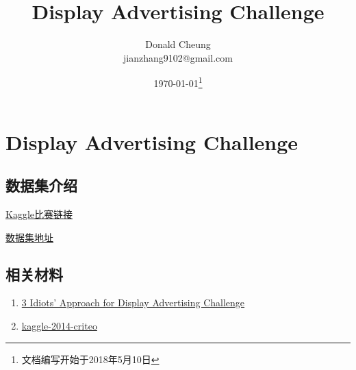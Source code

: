 \ifx\projectsnotes\undefined
    \providecommand{\notesroot}{../..}
    \providecommand{\criteoroot}{.}

    \title{Display Advertising Challenge}
    \author{Donald Cheung\\jianzhang9102@gmail.com}
    \date{\today\footnote{文档编写开始于2018年5月10日}}

    
\else
    \providecommand{\criteoroot}{\projectsroot/language_model}
\fi

\chapter{Display Advertising Challenge}

\section{数据集介绍}
\href{https://www.kaggle.com/c/criteo-display-ad-challenge}{Kaggle比赛链接}

\href{http://labs.criteo.com/2014/02/download-kaggle-display-advertising-challenge-dataset/}{数据集地址}

\section{相关材料}

\begin{enumerate}
    \item \href{https://www.csie.ntu.edu.tw/~r01922136/kaggle-2014-criteo.pdf}{3 Idiots’ Approach for Display Advertising Challenge}
    \item \href{https://github.com/zero91/kaggle-2014-criteo}{kaggle-2014-criteo}
\end{enumerate}

\ifx\projectsnotes\undefined
    
\fi
